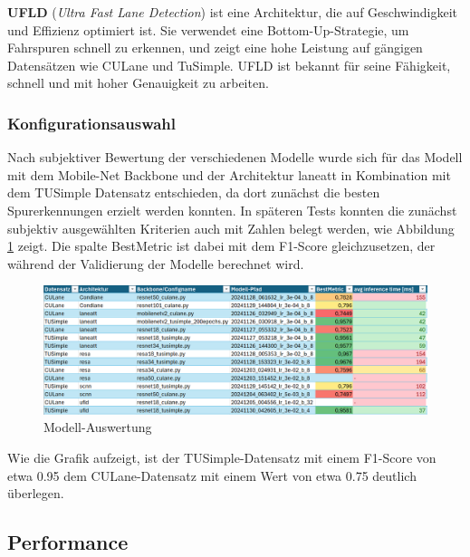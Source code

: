 \documentclass{article}
\begin{document}
                \textbf{UFLD} (\textit{Ultra Fast Lane Detection}) ist eine Architektur, die auf Geschwindigkeit und Effizienz optimiert ist. Sie verwendet eine Bottom-Up-Strategie, um Fahrspuren schnell zu erkennen, und zeigt eine hohe Leistung auf gängigen Datensätzen wie CULane und TuSimple. UFLD ist bekannt für seine Fähigkeit, schnell und mit hoher Genauigkeit zu arbeiten.
                \cite{Xu2024Exploring}

            \subsubsection{Konfigurationsauswahl}
                Nach subjektiver Bewertung der verschiedenen Modelle wurde sich für das Modell mit dem Mobile-Net Backbone und der Architektur laneatt in Kombination mit dem TUSimple Datensatz entschieden, da dort zunächst die besten Spurerkennungen erzielt werden konnten.
                In späteren Tests konnten die zunächst subjektiv ausgewählten Kriterien auch mit Zahlen belegt werden, wie Abbildung \ref{fig:Modell_Auswertung} zeigt.
                Die spalte BestMetric ist dabei mit dem F1-Score gleichzusetzen, der während der Validierung der Modelle berechnet wird.
                \begin{figure}[h!]
                    \includegraphics[width=\linewidth]{Auswertung_BackBone_Datensatz.png}
                    \caption{Modell-Auswertung}
                    \label{fig:Modell_Auswertung}
                \end{figure}
                Wie die Grafik aufzeigt, ist der TUSimple-Datensatz mit einem F1-Score von etwa 0.95 dem CULane-Datensatz mit einem Wert von etwa 0.75 deutlich überlegen.

        \subsection{Performance}
\end{document}
